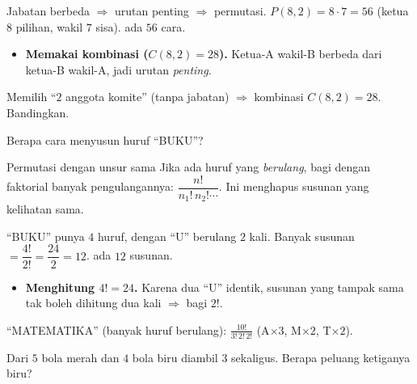 \jawab
{} Jabatan berbeda $\Rightarrow$ urutan penting $\Rightarrow$ permutasi.
 $P(8,2)=8\cdot7=56$ (ketua $8$ pilihan, wakil $7$ sisa).
\jadi ada $56$ cara.

\begin{jebakan}
\begin{itemize}[leftmargin=*,topsep=2pt]
  \item \textbf{Memakai kombinasi ($C(8,2)=28$).} Ketua-A wakil-B berbeda dari
  ketua-B wakil-A, jadi urutan \emph{penting}.
\end{itemize}
\end{jebakan}

\begin{variasi}
Memilih ``$2$ anggota komite'' (tanpa jabatan) $\Rightarrow$ kombinasi $C(8,2)=28$.
Bandingkan.
\end{variasi}

\begin{soalbox}{}
Berapa cara menyusun huruf ``BUKU''?
\end{soalbox}

\begin{ingat}{Permutasi dengan unsur sama}
Jika ada huruf yang \emph{berulang}, bagi dengan faktorial banyak
pengulangannya: $\dfrac{n!}{n_1!\,n_2!\cdots}$. Ini menghapus susunan yang
kelihatan sama.
\end{ingat}

\jawab
{} ``BUKU'' punya $4$ huruf, dengan ``U'' berulang $2$ kali.
 Banyak susunan $=\dfrac{4!}{2!}=\dfrac{24}{2}=12$.
\jadi ada $12$ susunan.

\begin{jebakan}
\begin{itemize}[leftmargin=*,topsep=2pt]
  \item \textbf{Menghitung $4!=24$.} Karena dua ``U'' identik, susunan yang
  tampak sama tak boleh dihitung dua kali $\Rightarrow$ bagi $2!$.
\end{itemize}
\end{jebakan}

\begin{variasi}
``MATEMATIKA'' (banyak huruf berulang): $\frac{10!}{3!\,2!\,2!}$ (A$\times3$,
M$\times2$, T$\times2$).
\end{variasi}

\begin{soalbox}{}
Dari $5$ bola merah dan $4$ bola biru diambil $3$ sekaligus. Berapa peluang
ketiganya biru?
\end{soalbox}

